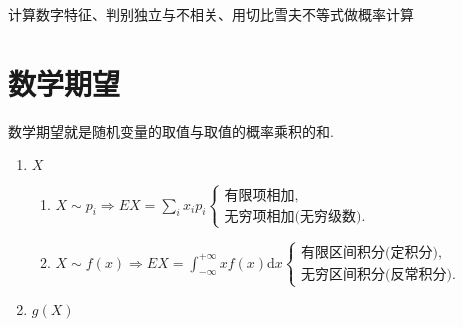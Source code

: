 
计算数字特征、判别独立与不相关、用切比雪夫不等式做概率计算

\section{数学期望}
数学期望就是随机变量的取值与取值的概率乘积的和.
\begin{enumerate}
      \item $X$
            \begin{enumerate}
                  \item $X\sim p_{i}\Rightarrow EX=\sum_{i}x_{i}p_{i}\begin{cases}\text{有限项相加,}\\\text{无穷项相加(无穷级数).}\end{cases}$
                  \item $X\sim f(x)\Rightarrow EX=\int_{-\infty}^{+\infty}xf(x)$d$x\begin{cases}\text{有限区间积分(定积分),}\\\text{无穷区间积分(反常积分).}\end{cases}$
            \end{enumerate}
      \item $g(X)$


\end{enumerate}
